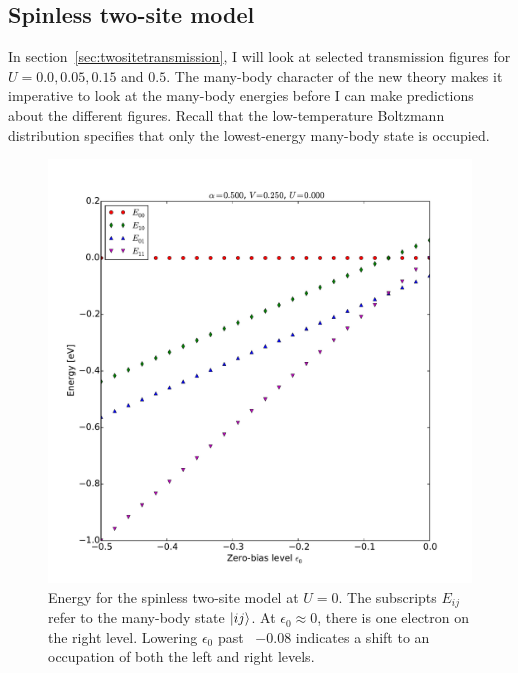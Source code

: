 \subsection{Spinless two-site model}
In section~\ref{sec:twositetransmission}, I will look at selected transmission figures for $U=0.0, 0.05, 0.15$ and $0.5$. The many-body character of the new theory makes it imperative to look at the many-body energies before I can make predictions about the different figures. Recall that the low-temperature Boltzmann distribution specifies that only the lowest-energy many-body state is occupied.
\begin{figure}[h]
    \centering
    \includegraphics[height=.45\textheight]{pdf/energy/perrin_distribution_u0.pdf}
    \caption{Energy for the spinless two-site model at $U=0$. The subscripts $E_{ij}$ refer to the many-body state $\ket{i j}$. At $\epsilon_0 \approx 0$, there is one electron on the right level. Lowering $\epsilon_0$ past ~$-0.08$ indicates a shift to an occupation of both the left and right levels.  }
    \label{fig:perrinenergy0}
\end{figure}
